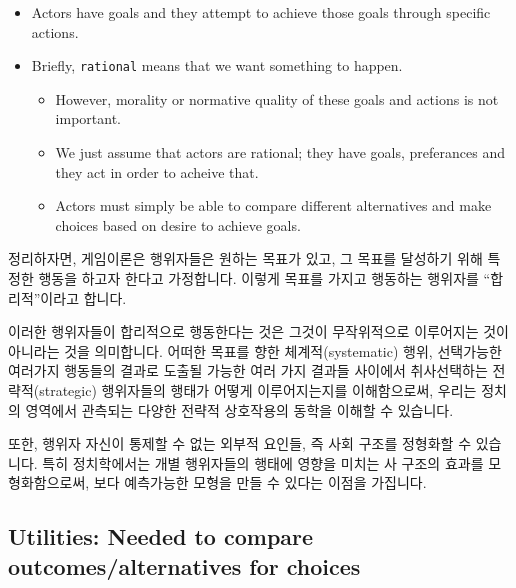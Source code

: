 \documentclass[]{book}
\providecommand{\tightlist}{%
  \setlength{\itemsep}{0pt}\setlength{\parskip}{0pt}}
\begin{document}
\begin{itemize}
\item
  Actors have goals and they attempt to achieve those goals through specific actions.
\item
  Briefly, \texttt{rational} means that we want something to happen.

  \begin{itemize}
  \tightlist
  \item
    However, morality or normative quality of these goals and actions is not important.
  \item
    We just assume that actors are rational; they have goals, preferances and they act in order to acheive that.
  \item
    Actors must simply be able to compare different alternatives and make choices based on desire to achieve goals.
  \end{itemize}
\end{itemize}

정리하자면, 게임이론은 행위자들은 원하는 목표가 있고, 그 목표를 달성하기 위해 특정한 행동을 하고자 한다고 가정합니다. 이렇게 목표를 가지고 행동하는 행위자를 ``합리적''이라고 합니다.

이러한 행위자들이 합리적으로 행동한다는 것은 그것이 무작위적으로 이루어지는 것이 아니라는 것을 의미합니다. 어떠한 목표를 향한 체계적(systematic) 행위, 선택가능한 여러가지 행동들의 결과로 도출될 가능한 여러 가지 결과들 사이에서 취사선택하는 전략적(strategic) 행위자들의 행태가 어떻게 이루어지는지를 이해함으로써, 우리는 정치의 영역에서 관측되는 다양한 전략적 상호작용의 동학을 이해할 수 있습니다.

또한, 행위자 자신이 통제할 수 없는 외부적 요인들, 즉 사회 구조를 정형화할 수 있습니다. 특히 정치학에서는 개별 행위자들의 행태에 영향을 미치는 사 구조의 효과를 모형화함으로써, 보다 예측가능한 모형을 만들 수 있다는 이점을 가집니다.

\hypertarget{utilities-needed-to-compare-outcomesalternatives-for-choices}{%
\subsection{Utilities: Needed to compare outcomes/alternatives for choices}\label{utilities-needed-to-compare-outcomesalternatives-for-choices}}
\end{document}
